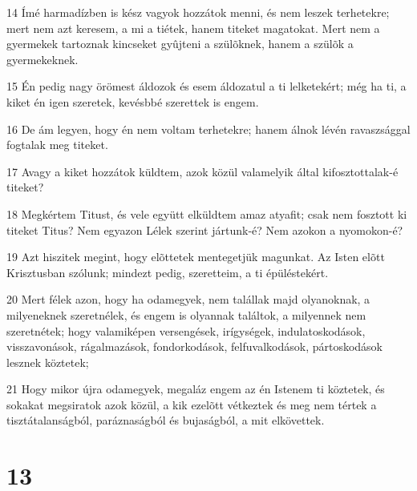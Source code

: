 \par 14 Ímé harmadízben is kész vagyok hozzátok menni, és nem leszek terhetekre; mert nem azt keresem, a mi a tiétek,  hanem titeket magatokat. Mert nem a gyermekek tartoznak kincseket gyûjteni a szülõknek, hanem a szülõk a gyermekeknek.
\par 15 Én pedig nagy örömest áldozok és esem áldozatul a ti lelketekért; még ha ti, a kiket én igen szeretek, kevésbbé  szerettek is engem.
\par 16 De ám legyen, hogy én nem voltam terhetekre; hanem álnok lévén ravaszsággal fogtalak meg titeket.
\par 17 Avagy a kiket hozzátok küldtem, azok közül valamelyik által kifosztottalak-é titeket?
\par 18 Megkértem Titust, és vele együtt elküldtem amaz atyafit; csak nem fosztott ki titeket Titus? Nem egyazon Lélek szerint jártunk-é? Nem azokon a nyomokon-é?
\par 19 Azt hiszitek megint, hogy elõttetek mentegetjük magunkat. Az Isten elõtt Krisztusban szólunk; mindezt pedig, szeretteim, a ti épüléstekért.
\par 20 Mert félek azon, hogy ha odamegyek, nem talállak majd olyanoknak, a milyeneknek szeretnélek, és engem is olyannak találtok, a milyennek nem szeretnétek; hogy valamiképen versengések, irígységek, indulatoskodások, visszavonások, rágalmazások, fondorkodások,  felfuvalkodások, pártoskodások lesznek köztetek;
\par 21 Hogy mikor újra odamegyek, megaláz engem az én Istenem ti köztetek, és sokakat megsiratok azok közül, a kik ezelõtt vétkeztek és meg nem tértek a tisztátalanságból, paráznaságból és bujaságból, a mit elkövettek.

\chapter{13}

